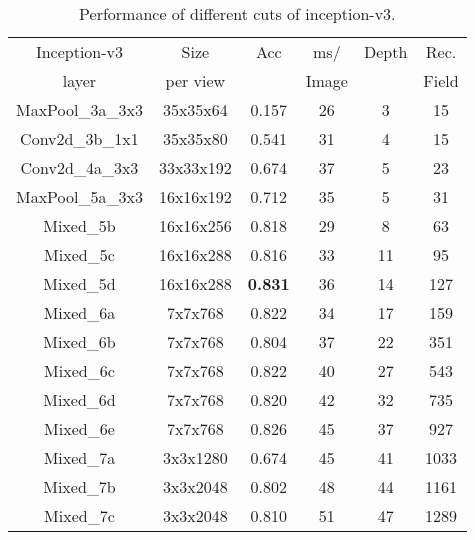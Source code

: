\documentclass[conference]{IEEEtran}
\begin{document}
\begin{table}[t]
  \caption{Performance of different cuts of inception-v3.}
\label{tab:inception-v3-results}
\begin{center}
\begin{tabular}{| c | c | c | c | c | c |}
\hline Inception-v3  & Size           & Acc    & ms/     & Depth & Rec. \\
       layer                & per view     &           & Image &           & Field  \\ \hline \hline
MaxPool\_3a\_3x3 & 35x35x64   & 0.157 & 26       & 3        & 15 \\ \hline
Conv2d\_3b\_1x1   & 35x35x80   & 0.541 & 31      & 4         & 15 \\ \hline
Conv2d\_4a\_3x3   & 33x33x192 & 0.674 & 37      & 5         & 23 \\ \hline
MaxPool\_5a\_3x3 & 16x16x192 & 0.712 & 35      & 5         & 31 \\ \hline
Mixed\_5b              & 16x16x256 & 0.818 & 29      & 8         & 63 \\ \hline
Mixed\_5c              & 16x16x288 & 0.816 & 33      & 11        & 95 \\ \hline
Mixed\_5d              & 16x16x288 & \textbf{0.831} & 36 & 14 & 127 \\ \hline
Mixed\_6a              & 7x7x768     & 0.822 & 34      & 17       & 159 \\ \hline
Mixed\_6b              & 7x7x768     & 0.804 & 37      & 22       & 351 \\ \hline
Mixed\_6c              & 7x7x768     & 0.822 & 40      & 27       & 543\\ \hline
Mixed\_6d              & 7x7x768     & 0.820 & 42      & 32       & 735\\ \hline
Mixed\_6e              & 7x7x768     & 0.826 & 45      & 37       & 927 \\ \hline
Mixed\_7a              & 3x3x1280   & 0.674 & 45      & 41       & 1033 \\ \hline
Mixed\_7b              & 3x3x2048   & 0.802 & 48      & 44       & 1161 \\ \hline
Mixed\_7c              & 3x3x2048   & 0.810 & 51      & 47       & 1289 \\ \hline
\end{tabular}
\end{center}
\end{table}
\end{document}
